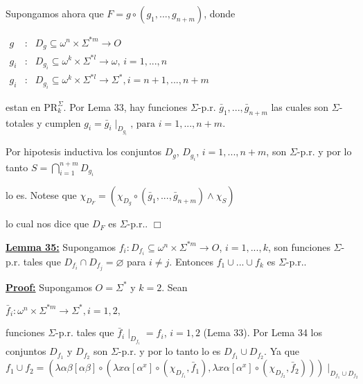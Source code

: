   Supongamos ahora que \(F=g\circ (g_{1},...,g_{n+m})\), donde

  \(\displaystyle \begin{array}{rcl} g & :& D_{g}\subseteq \omega ^{n}\times \Sigma ^{\ast m}\rightarrow O \\ g_{i} & :& D_{g_{i}}\subseteq \omega ^{k}\times \Sigma ^{\ast l}\rightarrow \omega \text{, }i=1,...,n \\ g_{i} & :& D_{g_{i}}\subseteq \omega ^{k}\times \Sigma ^{\ast l}\rightarrow \Sigma ^{\ast },i=n+1,...,n+m \end{array} \)

  estan en \(\mathrm{PR}_{k}^{\Sigma }.\) Por Lema 33, hay funciones \(\Sigma \)-p.r. \(\bar{g}_{1},...,\bar{g}_{n+m}\) las cuales son \( \Sigma \)-totales y cumplen
  \(\displaystyle g_{i}=\bar{g}_{i}\mid _{D_{g_{i}}}\text{, para }i=1,...,n+m. \)

  Por hipotesis inductiva los conjuntos \(D_{g}\), \(D_{g_{i}}\), \(i=1,...,n+m\), son \(\Sigma \)-p.r. y por lo tanto
  \(\displaystyle S=\bigcap_{i=1}^{n+m}D_{g_{i}} \)

  lo es. Notese que
  \(\displaystyle \chi _{D_{F}}=(\chi _{D_{g}}\circ \left( \bar{g}_{1},...,\bar{g} _{n+m}\right) \wedge \chi _{S}) \)

  lo cual nos dice que \(D_{F}\) es \(\Sigma \)-p.r.. \(\Box\)


  \textbf{\underline{Lemma 35:}} Supongamos \(f_{i}:D_{f_{i}}\subseteq \omega ^{n}\times \Sigma ^{\ast m}\rightarrow O\), \(i=1,...,k\), son funciones \(\Sigma \)-p.r. tales que \(D_{f_{i}}\cap D_{f_{j}}=\varnothing \) para \(i\neq j.\) Entonces \(f_{1}\cup ...\cup f_{k}\) es \(\Sigma \)-p.r..

  \textbf{\underline{Proof:}} Supongamos \(O=\Sigma ^{\ast }\) y \(k=2.\) Sean

  \(\displaystyle \bar{f}_{i}:\omega ^{n}\times \Sigma ^{\ast m}\rightarrow \Sigma ^{\ast },i=1,2, \)

  funciones \(\Sigma \)-p.r. tales que \(\bar{f}_{i}\mid _{D_{f_{i}}}=f_{i}\), \( i=1,2\) (Lema 33)\(.\) Por Lema 34 los conjuntos \(D_{f_{1}}\) y \(D_{f_{2}}\) son \(\Sigma \)-p.r. y por lo tanto lo es \( D_{f_{1}}\cup D_{f_{2}}\). Ya que
  \(\displaystyle f_{1}\cup f_{2}=\left( \lambda \alpha \beta \left[ \alpha \beta \right] \circ (\lambda x\alpha \left[ \alpha ^{x}\right] \circ (\chi _{D_{f_{1}}}, \bar{f}_{1}),\lambda x\alpha \left[ \alpha ^{x}\right] \circ (\chi _{D_{f_{2}}},\bar{f}_{2}))\right) \mid _{D_{f_{1}}\cup D_{f_{2}}} \)

